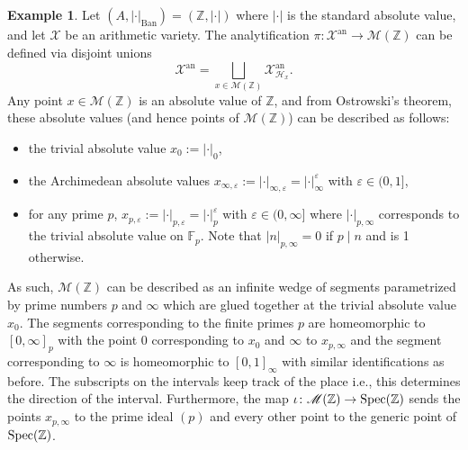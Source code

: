 \documentclass[11pt,reqno]{amsart}
\newcommand{\mZ}{\mathbb{Z}}
\newcommand{\mF}{\mathbb{F}}
\newcommand{\cX}{\mathcal{X}}
\newcommand{\sH}{{\mathscr H}}
\newcommand{\sM}{{\mathscr M}}
\theoremstyle{theorem}
\numberwithin{equation}{subsection}
\numberwithin{equation}{subsection}
\theoremstyle{definition}
\newtheorem{example}[subsubsection]{Example}
\theoremstyle{remark}
\numberwithin{equation}{subsubsection} \numberwithin{figure}{section}
\DeclareMathOperator{\an}{an}
\DeclareMathOperator{\Ban}{Ban}
\begin{document}
\begin{example}\label{exam:BerkovichoverZ}
Let $(A,|\cdot|_{\Ban}) = (\mZ,|\cdot|)$ where $|\cdot|$ is the standard absolute value, and let $\cX$ be an arithmetic variety. 
The analytification $\pi\colon \cX^{\an} \to \sM(\mZ)$ can be defined via disjoint unions
\[
\cX^{\an} = \bigsqcup_{x\in \sM(\mZ)} \cX_{\sH_x}^{\an}.
\]
Any point $x\in \sM(\mZ)$ is an absolute value of $\mZ$, and from Ostrowski's theorem, these absolute values (and hence points of $\sM(\mZ)$) can be described as follows:
\begin{itemize}
\item the trivial absolute value $x_0 := |\cdot|_0$,
\item the Archimedean absolute values $x_{\infty,\varepsilon} := |\cdot|_{\infty,\varepsilon} = |\cdot|_{\infty}^{\varepsilon}$ with $\varepsilon\in (0,1]$,
\item for any prime $p$, $x_{p,\varepsilon} := |\cdot|_{p,\varepsilon} = |\cdot|_{p}^{\varepsilon}$ with $\varepsilon \in (0,\infty]$ where $|\cdot|_{p,\infty}$ corresponds to the trivial absolute value on $\mF_p$. Note that $|n|_{p,\infty} = 0$ if $p\mid n$ and is 1 otherwise. 
\end{itemize}


As such, $\sM(\mZ)$ can be described as an infinite wedge of segments parametrized by prime numbers $p$ and $\infty$ which are glued together at the trivial absolute value $x_0$. The segments corresponding to the finite primes $p$ are homeomorphic to $[0,\infty]_p$ with the point $0$ corresponding to $x_0$ and $\infty$ to $x_{p,\infty}$ and the segment corresponding to $\infty$ is homeomorphic to $[0,1]_{\infty}$ with similar identifications as before. 
The subscripts on the intervals keep track of the place i.e., this determines the direction of the interval. 
Furthermore, the map $\iota\colon \sM(\mZ)\to \Spec(\mZ)$ sends the points $x_{p,\infty}$ to the prime ideal $(p)$ and every other point to the generic point of $\Spec(\mZ)$. 


\end{example}
\end{document}
